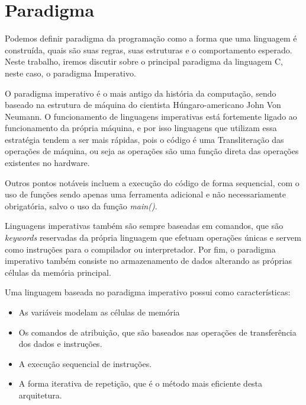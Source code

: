 \chapter{Paradigma}


Podemos definir paradigma da programação como a forma que uma linguagem é construída,
 quais são suas regras, suas estruturas e o comportamento esperado. Neste trabalho,
  iremos discutir sobre o principal paradigma da linguagem C, neste caso, o paradigma Imperativo.

O paradigma imperativo é o mais antigo da história da computação, sendo baseado na estrutura de máquina 
do cientista Húngaro-americano John Von Neumann. O funcionamento de linguagens imperativas está fortemente
 ligado ao funcionamento da própria máquina, e por isso linguagens que utilizam essa estratégia tendem a ser mais rápidas, 
 pois o código é uma Transliteração das operações de máquina, ou seja as operações são uma função direta das operações existentes no hardware.  

Outros pontos notáveis incluem a execução do código de forma sequencial, com o uso de funções sendo apenas uma ferramenta adicional
e não necessariamente obrigatória, salvo o uso da função \emph{main()}.

Linguagens imperativas também são sempre baseadas em comandos, que são \emph{keywords} 
reservadas da própria linguagem que efetuam operações únicas e servem como instruções para o compilador ou interpretador.
Por fim, o paradigma imperativo também consiste no armazenamento de dados alterando as próprias células da memória principal.


Uma linguagem baseada no paradigma imperativo possui como características:

\begin{itemize}
    \item As variáveis  modelam as células de memória
    \item Os comandos de atribuição, que são baseados nas operações de
    transferência dos dados e instruções.
    \item A execução sequencial de instruções.
    \item A forma iterativa de repetição, que é o método mais eficiente desta arquitetura.

\end{itemize}
\nocite{paradigmaimperativo}
\nocite{Imperative_programming}
\nocite{Imperativeprogramming}
\newpage